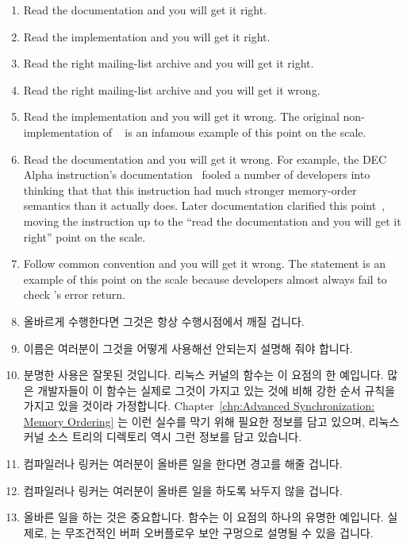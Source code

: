 \begin{enumerate}
\item	Read the documentation and you will get it right.
\item	Read the implementation and you will get it right.
\item	Read the right mailing-list archive and you will get it right.
\item	Read the right mailing-list archive and you will get it wrong.
\item	Read the implementation and you will get it wrong.
	The original non- implementation of
	~\cite{PaulEMcKenney2007PreemptibleRCU}
	is an infamous example of this point on the scale.
\item	Read the documentation and you will get it wrong.
	For example, the DEC Alpha  instruction's
	documentation~\cite{ALPHA2002} fooled a
	number of developers into thinking that that this instruction
	had much stronger memory-order semantics than it actually does.
	Later documentation clarified this
	point~\cite{Compaq01,WilliamPugh2000Gharachorloo},
	moving the  instruction up to the
	``read the documentation and you will get it right'' point on
	the scale.
\item	Follow common convention and you will get it wrong.
	The  statement is an example of this point on the
	scale because
	developers almost always fail to check 's error return.
\fi
\item	올바르게 수행한다면 그것은 항상 수행시점에서 깨질 겁니다.
\item	이름은 여러분이 그것을 어떻게 사용해선 안되는지 설명해 줘야 합니다.
\item	분명한 사용은 잘못된 것입니다.
	리눅스 커널의  함수는 이 요점의 한 예입니다.
	많은 개발자들이 이 함수는 실제로 그것이 가지고 있는 것에 비해 강한 순서
	규칙을 가지고 있을 것이라 가정합니다.
	Chapter~\ref{chp:Advanced Synchronization: Memory Ordering} 는 이런
	실수를 막기 위해 필요한 정보를 담고 있으며, 리눅스 커널 소스 트리의
	 디렉토리 역시 그런 정보를 담고 있습니다.
\item	컴파일러나 링커는 여러분이 올바른 일을 한다면 경고를 해줄 겁니다.
\item	컴파일러나 링커는 여러분이 올바른 일을 하도록 놔두지 않을 겁니다.
\item	올바른 일을 하는 것은 중요합니다.
	 함수는 이 요점의 하나의 유명한 예입니다.
	실제로,  는 무조건적인 버퍼 오버플로우 보안 구멍으로 설명될
	수 있을 겁니다.
\iffalse


\end{enumerate}
